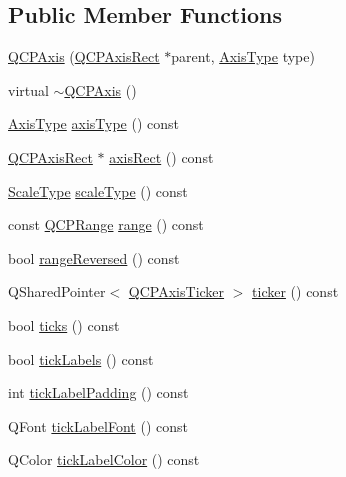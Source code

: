 \subsection*{Public Member Functions}
\begin{DoxyCompactItemize}
\item 
\mbox{\hyperlink{class_q_c_p_axis_ac62c042968bae0e6d474fcfc57c9b71f}{Q\+C\+P\+Axis}} (\mbox{\hyperlink{class_q_c_p_axis_rect}{Q\+C\+P\+Axis\+Rect}} $\ast$parent, \mbox{\hyperlink{class_q_c_p_axis_ae2bcc1728b382f10f064612b368bc18a}{Axis\+Type}} type)
\item 
virtual \mbox{\hyperlink{class_q_c_p_axis_a7cfa27ea9da0bb1fe0ae995572c0b85d}{$\sim$\+Q\+C\+P\+Axis}} ()
\item 
\mbox{\hyperlink{class_q_c_p_axis_ae2bcc1728b382f10f064612b368bc18a}{Axis\+Type}} \mbox{\hyperlink{class_q_c_p_axis_aa19679359783c5ecd27757b7e5619976}{axis\+Type}} () const
\item 
\mbox{\hyperlink{class_q_c_p_axis_rect}{Q\+C\+P\+Axis\+Rect}} $\ast$ \mbox{\hyperlink{class_q_c_p_axis_afc94bcfdf8adfe8e01013f13bdf159a2}{axis\+Rect}} () const
\item 
\mbox{\hyperlink{class_q_c_p_axis_a36d8e8658dbaa179bf2aeb973db2d6f0}{Scale\+Type}} \mbox{\hyperlink{class_q_c_p_axis_ad23e9ad97b44e9aeaf4fab8904280098}{scale\+Type}} () const
\item 
const \mbox{\hyperlink{class_q_c_p_range}{Q\+C\+P\+Range}} \mbox{\hyperlink{class_q_c_p_axis_ac4058855a81f1a883cf2e754f6a6acb1}{range}} () const
\item 
bool \mbox{\hyperlink{class_q_c_p_axis_ab9866dd1a78f1920f491ec12a794bec2}{range\+Reversed}} () const
\item 
Q\+Shared\+Pointer$<$ \mbox{\hyperlink{class_q_c_p_axis_ticker}{Q\+C\+P\+Axis\+Ticker}} $>$ \mbox{\hyperlink{class_q_c_p_axis_a7b7a27151be8235059e1294f73ecf615}{ticker}} () const
\item 
bool \mbox{\hyperlink{class_q_c_p_axis_a5c3da767a2dc990f200856a9e27ea06e}{ticks}} () const
\item 
bool \mbox{\hyperlink{class_q_c_p_axis_ae4158bbc52939ee52cdb12b805860a28}{tick\+Labels}} () const
\item 
int \mbox{\hyperlink{class_q_c_p_axis_afac7316ca35941e7080f98e0022c1891}{tick\+Label\+Padding}} () const
\item 
Q\+Font \mbox{\hyperlink{class_q_c_p_axis_a09f339b7125cf1094920f86687b88236}{tick\+Label\+Font}} () const
\item 
Q\+Color \mbox{\hyperlink{class_q_c_p_axis_a9e21b2326bb2de0b7a8efcd1efc0ce78}{tick\+Label\+Color}} () const

\end{DoxyCompactItemize}

